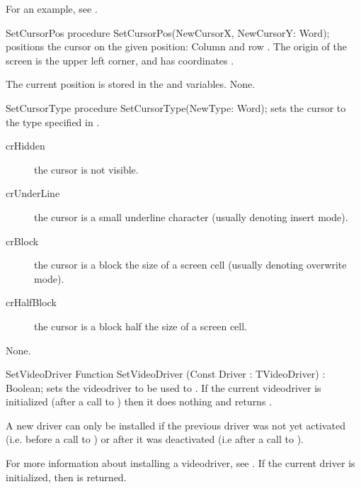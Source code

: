 For an example, see .

\begin{procedure}{SetCursorPos}
\Declaration
procedure SetCursorPos(NewCursorX, NewCursorY: Word); 
\Description
{} positions the cursor on the given position: Column 
 and row . The origin of the screen is the
upper left corner, and has coordinates .

The current position is stored in the  and 
variables.
\Errors
None.
\SeeAlso
{}
\end{procedure}


\begin{procedure}{SetCursorType}
\Declaration
procedure SetCursorType(NewType: Word); 
\Description
{} sets the cursor to the type specified in .
\begin{description}
\item[crHidden] the cursor is not visible.
\item[crUnderLine] the cursor is a small underline character (usually 
denoting insert mode).
\item[crBlock] the cursor is a block the size of a screen cell (usually
denoting overwrite mode).
\item[crHalfBlock] the cursor is a block half the size of a screen cell.
\end{description}
\Errors
None.
\SeeAlso
{}
\end{procedure}

\begin{function}{SetVideoDriver}
\Declaration
Function SetVideoDriver (Const Driver : TVideoDriver) : Boolean;
\Description
{} sets the videodriver to be used to . If
the current videodriver is initialized (after a call to )
then it does nothing and returns .

A new driver can only be installed if the previous driver was not yet
activated (i.e. before a call to ) or after it was
deactivated (i.e after a call to ).

For more information about installing a videodriver, see .
\Errors
If the current driver is initialized, then  is returned.
\SeeAlso
{}
\end{function}


